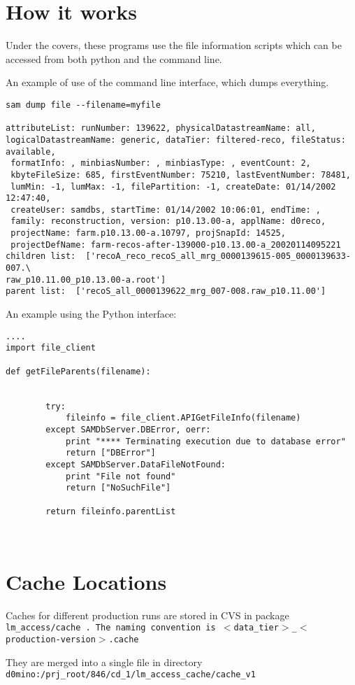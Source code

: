 \documentclass[12pt]{article}
\begin{document}
\section{How it works}
Under the covers, these programs use the file information scripts which can be
accessed from both python and the command line.

An example of use of the command line interface, which dumps everything.



\begin{verbatim}
sam dump file --filename=myfile

attributeList: runNumber: 139622, physicalDatastreamName: all,
logicalDatastreamName: generic, dataTier: filtered-reco, fileStatus: available,
 formatInfo: , minbiasNumber: , minbiasType: , eventCount: 2,
 kbyteFileSize: 685, firstEventNumber: 75210, lastEventNumber: 78481,
 lumMin: -1, lumMax: -1, filePartition: -1, createDate: 01/14/2002 12:47:40,
 createUser: samdbs, startTime: 01/14/2002 10:06:01, endTime: ,
 family: reconstruction, version: p10.13.00-a, applName: d0reco,
 projectName: farm.p10.13.00-a.10797, projSnapId: 14525,
 projectDefName: farm-recos-after-139000-p10.13.00-a_20020114095221
children list:  ['recoA_reco_recoS_all_mrg_0000139615-005_0000139633-007.\
raw_p10.11.00_p10.13.00-a.root']
parent list:  ['recoS_all_0000139622_mrg_007-008.raw_p10.11.00']
\end{verbatim}

An example using the Python interface:
\begin{verbatim}
....
import file_client

def getFileParents(filename):


        try:
            fileinfo = file_client.APIGetFileInfo(filename)
        except SAMDbServer.DBError, oerr:
            print "**** Terminating execution due to database error"
            return ["DBError"]
        except SAMDbServer.DataFileNotFound:
            print "File not found"
            return ["NoSuchFile"]

        return fileinfo.parentList



\end{verbatim}
\section {Cache Locations}

Caches for different production runs are stored in CVS in package \tt lm\_access/cache \rm.
The naming convention is \tt$<$data\_tier$>$\_$<$production-version$>$.cache \rm

They are merged into a single file in directory \tt d0mino:/prj\_root/846/cd\_1/lm\_access\_cache/cache\_v1 \rm
\end{document}
